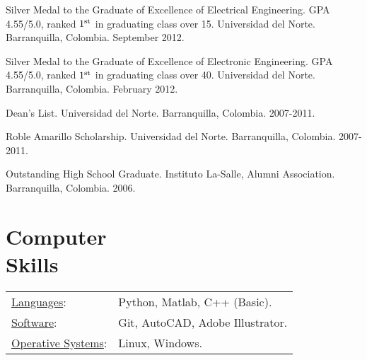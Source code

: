 \documentclass[margin]{res}
\begin{document}
\begin{resume}
Silver Medal to the Graduate of Excellence of Electrical Engineering.
GPA 4.55/5.0, ranked ${1^{{\rm{st}}}}$ in graduating class over 15.
Universidad del Norte. Barranquilla, Colombia. September 2012.

Silver Medal to the Graduate of Excellence of Electronic Engineering.
GPA 4.55/5.0, ranked ${1^{{\rm{st}}}}$ in graduating class over 40.
Universidad del Norte. Barranquilla, Colombia. February 2012.

Dean's List. Universidad del Norte. Barranquilla, Colombia. 2007-2011.

Roble Amarillo Scholarship. Universidad del Norte. 
Barranquilla, Colombia. 2007-2011.

Outstanding High School Graduate. Instituto La-Salle, Alumni Association.
Barranquilla, Colombia. 2006.


\section{Computer \\ Skills}
   \begin{tabular}{l p{3in}}
    \underline{Languages}: & Python, Matlab, C++ (Basic). \\

    \underline{Software}: & Git, AutoCAD, Adobe Illustrator. \\
    
    \underline{Operative Systems}: & Linux, Windows. \\
 \end{tabular}

\end{resume} 
\end{document}

